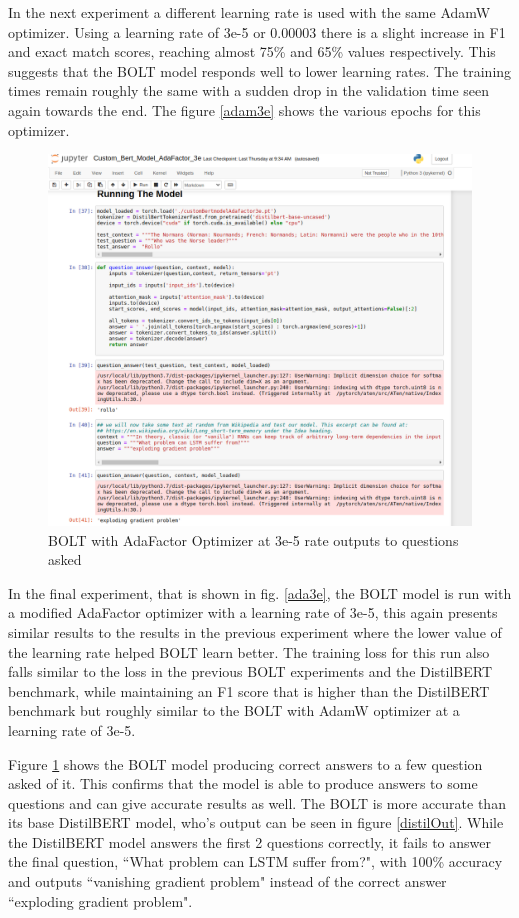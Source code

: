 \documentclass[a4paper,12pt]{report}
\begin{document}
	In the next experiment a different learning rate is used with the same AdamW optimizer. Using a learning rate of 3e-5 or 0.00003 there is a slight increase in F1 and exact match scores, reaching almost 75\% and 65\% values respectively. This suggests that the BOLT model responds well to lower learning rates. The training times remain roughly the same with a sudden drop in the validation time seen again towards the end. 	The figure \ref{adam3e} shows the various epochs for this optimizer.
	\begin{figure}[!h]
		\centering
		\includegraphics[scale=0.4]{../images/AdaFactor3e-output.png}
		\caption{BOLT with AdaFactor Optimizer at 3e-5 rate outputs to questions asked}\label{ada3e-output}
	\end{figure}
	
	In the final experiment, that is shown in fig. \ref{ada3e}, the BOLT model is run with a modified AdaFactor optimizer with a learning rate of 3e-5, this again presents similar results to the results in the previous experiment where the lower value of the learning rate helped BOLT learn better. The training loss for this run also falls similar to the loss in the previous BOLT experiments and the DistilBERT benchmark, while maintaining an F1 score that is higher than the DistilBERT benchmark but roughly similar to the BOLT with AdamW optimizer at a learning rate of 3e-5.


    Figure \ref{ada3e-output} shows the BOLT model producing correct answers to a few question asked of it. This confirms that the model is able to produce answers to some questions and can give accurate results as well. The BOLT is more accurate than its base DistilBERT model, who's output can be seen in figure \ref{distilOut}. While the DistilBERT model answers the first 2 questions correctly, it fails to answer the final question, ``What problem can LSTM suffer from?", with 100\% accuracy and outputs ``vanishing gradient problem" instead of the correct answer ``exploding gradient problem".
\end{document}
